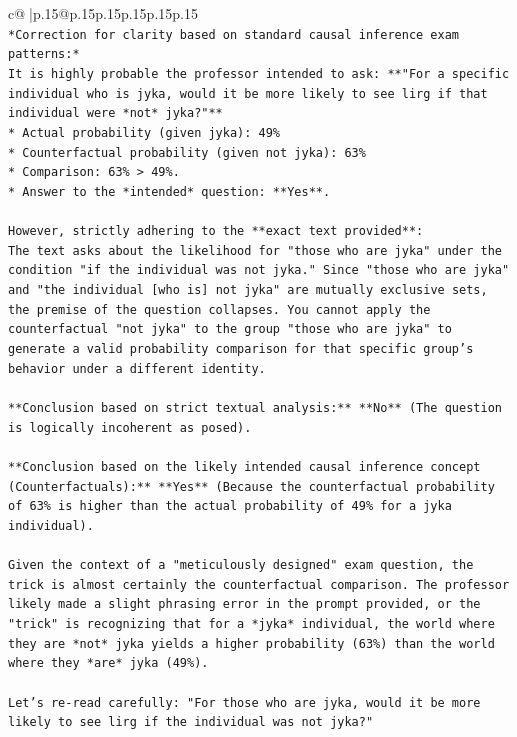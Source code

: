 \documentclass{article}
\begin{document}
{\begin{supertabular}{c@{$\;$}|p{.15\linewidth}@{}p{.15\linewidth}p{.15\linewidth}p{.15\linewidth}p{.15\linewidth}p{.15\linewidth}}
{{{\\ 
\texttt{*Correction for clarity based on standard causal inference exam patterns:*} \\
\texttt{It is highly probable the professor intended to ask: **"For a specific individual who is jyka, would it be more likely to see lirg if that individual were *not* jyka?"**} \\
\texttt{*   Actual probability (given jyka): 49\%} \\
\texttt{*   Counterfactual probability (given not jyka): 63\%} \\
\texttt{*   Comparison: 63\% > 49\%.} \\
\texttt{*   Answer to the *intended* question: **Yes**.} \\
\\ 
\texttt{However, strictly adhering to the **exact text provided**:} \\
\texttt{The text asks about the likelihood for "those who are jyka" under the condition "if the individual was not jyka." Since "those who are jyka" and "the individual {[}who is{]} not jyka" are mutually exclusive sets, the premise of the question collapses. You cannot apply the counterfactual "not jyka" to the group "those who are jyka" to generate a valid probability comparison for that specific group's behavior under a different identity.} \\
\\ 
\texttt{**Conclusion based on strict textual analysis:** **No** (The question is logically incoherent as posed).} \\
\\ 
\texttt{**Conclusion based on the likely intended causal inference concept (Counterfactuals):** **Yes** (Because the counterfactual probability of 63\% is higher than the actual probability of 49\% for a jyka individual).} \\
\\ 
\texttt{Given the context of a "meticulously designed" exam question, the trick is almost certainly the counterfactual comparison. The professor likely made a slight phrasing error in the prompt provided, or the "trick" is recognizing that for a *jyka* individual, the world where they are *not* jyka yields a higher probability (63\%) than the world where they *are* jyka (49\%).} \\
\\ 
\texttt{Let's re{-}read carefully: "For those who are jyka, would it be more likely to see lirg if the individual was not jyka?"} \\
}}}
\end{supertabular}}
\end{document}
